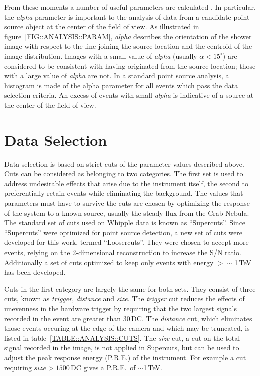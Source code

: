 From these moments a number of useful parameters are calculated
\citep[see appendices of][]{REF::REYNOLDS::APJ1993}. In particular,
the \textit{alpha} parameter is important to the analysis of data from
a candidate point-source object at the center of the field of view. As
illustrated in figure~\ref{FIG::ANALYSIS::PARAM},
\textit{alpha} describes the orientation of the shower image with
respect to the line joining the source location and the centroid of
the image distribution. Images with a small value of \textit{alpha}
(usually $\alpha<15^\circ$) are considered to be consistent with
having originated from the source location; those with a large value of
\textit{alpha} are not. In a standard point source analysis, a
histogram is made of the alpha parameter for all events which pass the
data selection criteria. An excess of events with small \textit{alpha}
is indicative of a source at the center of the field of view.

\section{Data Selection}
\label{SEC::ANALYSIS::DATASELECTION}

Data selection is based on strict cuts of the parameter values
described above. Cuts can be considered as belonging to two
categories.  The first set is used to address undesirable effects that
arise due to the instrument itself, the second to preferentially
retain \Gray events while eliminating the background. The values that
parameters must have to survive the cuts are chosen by optimizing the
response of the system to a known \Gray source, usually the steady
flux from the Crab Nebula. The standard set of cuts used on Whipple
data is known as ``Supercuts''. Since ``Supercuts'' were optimized for
point source detection, a new set of cuts were developed for this
work, termed ``Loosercuts''. They were chosen to accept more events,
relying on the 2-dimensional reconstruction to increase the S/N
ratio. Additionally a set of cuts optimized to keep only events with
energy $>\sim$1\,TeV has been developed.

Cuts in the first category are largely the same for both sets. They
consist of three cuts, known as \textit{trigger}, \textit{distance}
and \textit{size}. The \textit{trigger} cut reduces the effects of
unevenness in the hardware trigger by requiring that the two largest
signals recorded in the event are greater than 30\,DC. The
\textit{distance} cut, which eliminates those events occuring at the
edge of the camera and which may be truncated, is listed in
table~\ref{TABLE::ANALYSIS::CUTS}. The \textit{size} cut, a cut on the
total signal recorded in the image, is not applied in Supercuts, but
can be used to adjust the peak response energy (P.R.E.) of the
instrument. For example a cut requiring $size>1500$\,DC gives a
P.R.E.\ of $\sim$1\,TeV.

